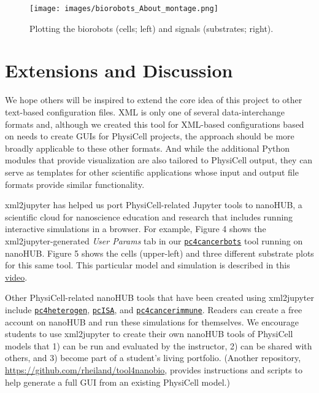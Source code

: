 \documentclass[10pt,letterpaper]{article}
\begin{document}
\begin{figure}
\centering
\texttt{[image: images/biorobots\_About\_montage.png]}
\captionsetup{justification=centering}
\caption{Plotting the biorobots (cells; left) and signals (substrates;
right).}
\end{figure}

\hypertarget{extensions-and-discussion}{%
\section{Extensions and Discussion}\label{extensions-and-discussion}}

We hope others will be inspired to extend the core idea of this project
to other text-based configuration files. XML is only one of several
data-interchange formats and, although we created this tool for
XML-based configurations based on needs to create GUIs for PhysiCell
projects, the approach should be more broadly applicable to these other
formats. And while the additional Python modules that provide
visualization are also tailored to PhysiCell output, they can serve as
templates for other scientific applications whose input and output file
formats provide similar functionality.

xml2jupyter has helped us port PhysiCell-related Jupyter tools to
nanoHUB, a scientific cloud for nanoscience education and research that
includes running interactive simulations in a browser. For example,
Figure 4 shows the xml2jupyter-generated \emph{User Params} tab in our
\href{https://nanohub.org/tools/pc4cancerbots}{\texttt{pc4cancerbots}}
tool running on nanoHUB. Figure 5 shows the cells (upper-left) and three
different substrate plots for this same tool. This particular model and
simulation is described in this
\href{https://www.youtube.com/watch?v=wuDZ40jW__M}{video}.

Other PhysiCell-related nanoHUB tools that have been created using
xml2jupyter include
\href{https://nanohub.org/tools/pc4heterogen}{\texttt{pc4heterogen}},
\href{https://nanohub.org/tools/pcisa}{\texttt{pcISA}}, and
\href{https://nanohub.org/tools/pc4cancerimmune}{\texttt{pc4cancerimmune}}.
Readers can create a free account on nanoHUB and run these simulations
for themselves. We encourage students to use xml2jupyter to create their
own nanoHUB tools of PhysiCell models that 1) can be run and evaluated
by the instructor, 2) can be shared with others, and 3) become part of a
student's living portfolio. (Another repository,
\url{https://github.com/rheiland/tool4nanobio}, provides instructions
and scripts to help generate a full GUI from an existing PhysiCell
model.)
\end{document}
